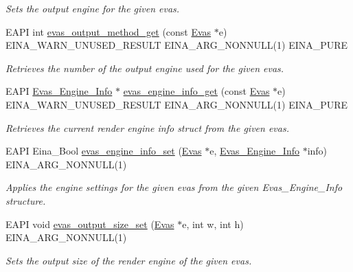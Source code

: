\begin{DoxyCompactItemize}
\begin{DoxyCompactList}\small\item\em Sets the output engine for the given evas. \item\end{DoxyCompactList}\item 
EAPI int \hyperlink{group__Evas__Output__Method_gac4127a10231f1851cc3443a84fb0b059}{evas\_\-output\_\-method\_\-get} (const \hyperlink{group__Evas__Canvas_ga5ff87cc4ce6bc43e3b640a6d37f73043}{Evas} $\ast$e) EINA\_\-WARN\_\-UNUSED\_\-RESULT EINA\_\-ARG\_\-NONNULL(1) EINA\_\-PURE
\begin{DoxyCompactList}\small\item\em Retrieves the number of the output engine used for the given evas. \item\end{DoxyCompactList}\item 
EAPI \hyperlink{struct__Evas__Engine__Info}{Evas\_\-Engine\_\-Info} $\ast$ \hyperlink{group__Evas__Output__Method_ga882d5f9411b5556719bdf28a134ee713}{evas\_\-engine\_\-info\_\-get} (const \hyperlink{group__Evas__Canvas_ga5ff87cc4ce6bc43e3b640a6d37f73043}{Evas} $\ast$e) EINA\_\-WARN\_\-UNUSED\_\-RESULT EINA\_\-ARG\_\-NONNULL(1) EINA\_\-PURE
\begin{DoxyCompactList}\small\item\em Retrieves the current render engine info struct from the given evas. \item\end{DoxyCompactList}\item 
EAPI Eina\_\-Bool \hyperlink{group__Evas__Output__Method_gafeff04b89b4498eedf99c89e0a06e604}{evas\_\-engine\_\-info\_\-set} (\hyperlink{group__Evas__Canvas_ga5ff87cc4ce6bc43e3b640a6d37f73043}{Evas} $\ast$e, \hyperlink{struct__Evas__Engine__Info}{Evas\_\-Engine\_\-Info} $\ast$info) EINA\_\-ARG\_\-NONNULL(1)
\begin{DoxyCompactList}\small\item\em Applies the engine settings for the given evas from the given {\ttfamily Evas\_\-Engine\_\-Info} structure. \item\end{DoxyCompactList}\item 
EAPI void \hyperlink{group__Evas__Output__Size_gaaf571f18f97f4067f554ab7713f01063}{evas\_\-output\_\-size\_\-set} (\hyperlink{group__Evas__Canvas_ga5ff87cc4ce6bc43e3b640a6d37f73043}{Evas} $\ast$e, int w, int h) EINA\_\-ARG\_\-NONNULL(1)
\begin{DoxyCompactList}\small\item\em Sets the output size of the render engine of the given evas. \item\end{DoxyCompactList}\item 

\end{DoxyCompactItemize}
